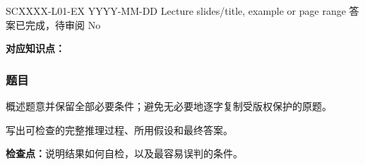 

\examplemeta
  {SCXXXX-L01-EX}
  {YYYY-MM-DD}
  {Lecture slides/title, example or page range}
  {答案已完成，待审阅}
  {No}


\textbf{对应知识点：}

\subsubsection*{题目}

概述题意并保留全部必要条件；避免无必要地逐字复制受版权保护的原题。

\begin{workedsolution}
写出可检查的完整推理过程、所用假设和最终答案。
\end{workedsolution}

\textbf{检查点：}说明结果如何自检，以及最容易误判的条件。
